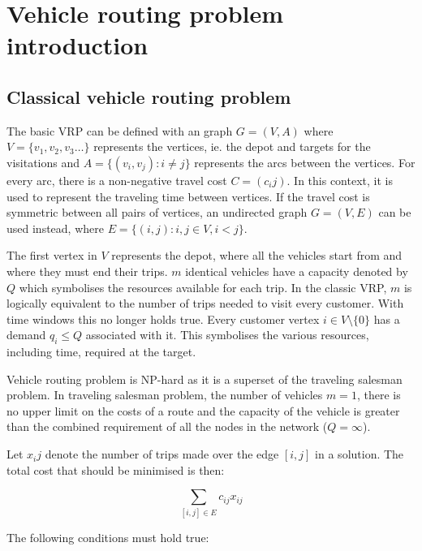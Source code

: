 \chapter{Vehicle routing problem introduction}
\label{chapter:background} 

\section{Classical vehicle routing problem}



The basic VRP can be defined with an graph $G = (V, A)$ where $V = \{v_1, v_2, v_3\dots\}$ represents the vertices, ie. the depot and targets for the visitations and $A = \{(v_i, v_j): i \neq j \}$ represents the arcs between the vertices. For every arc, there is a non-negative travel cost $C=(c_ij)$. In this context, it is used to represent the traveling time between vertices. If the travel cost is symmetric between all pairs of vertices, an undirected graph $G = (V, E)$ can be used instead, where $E=\{(i, j) : i, j \in V, i < j\}$. \cite{laporte2007you}

The first vertex in $V$ represents the depot, where all the vehicles start from and where they must end their trips. $m$ identical vehicles have a capacity denoted by $Q$ which symbolises the resources available for each trip. In the classic VRP, $m$ is logically equivalent to the number of trips needed to visit every customer. With time windows this no longer holds true. Every customer vertex $i \in V\setminus\{0\}$ has a demand $q_i \leq Q$ associated with it. This symbolises the various resources, including time, required at the target. \cite{laporte2007you}

Vehicle routing problem is NP-hard as it is a superset of the traveling salesman problem. In traveling salesman problem, the number of vehicles $m = 1$, there is no upper limit on the costs of a route and the capacity of the vehicle is greater than the combined requirement of all the nodes in the network ($Q = \infty$). \cite{laporte2007you} 

Let $x_ij$ denote the number of trips made over the edge $[i, j]$ in a solution. The total cost that should be minimised is then:

\begin{equation}
\label{eq:baseformula1}
\displaystyle \sum_{[i,j] \in E} c_{ij}x_{ij}
\end{equation}

\noindent
The following conditions must hold true:

